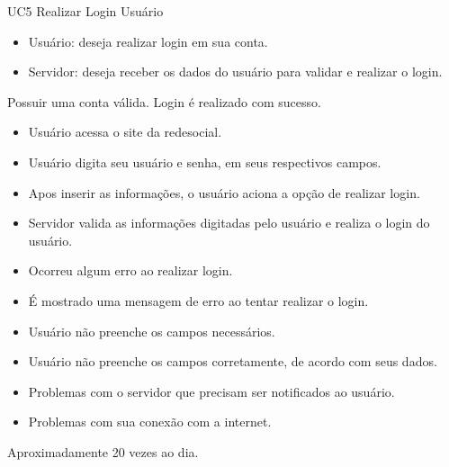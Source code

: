 \casoDeUso
{UC5}
{Realizar Login}
{Usuário}
{
\begin{itemize}
	\item Usuário: deseja realizar login em sua conta.
	\item Servidor: deseja receber os dados do usuário para validar e realizar o login.
\end{itemize}

}
{Possuir uma conta válida.}
{Login é realizado com sucesso.}
{
\begin{itemize}
\item Usuário acessa o site da redesocial.
\item Usuário digita seu usuário e senha, em seus respectivos campos.
\item Apos inserir as informações, o usuário aciona a opção de realizar login.
\item Servidor valida as informações digitadas pelo usuário e realiza o login do usuário.
\end{itemize}
}
{
\begin{itemize}
\item Ocorreu algum erro ao realizar login.
\item É mostrado uma mensagem de erro ao tentar realizar o login.
\item Usuário não preenche os campos necessários.
\item Usuário não preenche os campos corretamente, de acordo com seus dados.
\item Problemas com o servidor que precisam ser notificados ao usuário.
\item Problemas com sua conexão com a internet.
\end{itemize}
}
{Aproximadamente 20 vezes ao dia.}
{

}

